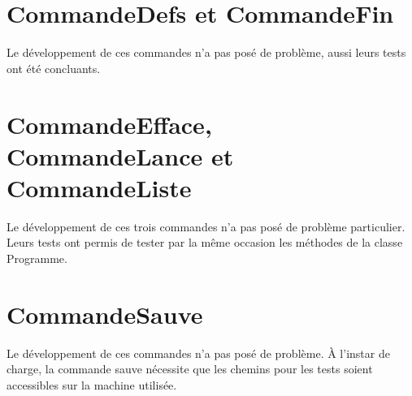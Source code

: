 \section{CommandeDefs et CommandeFin}

Le développement de ces commandes n'a pas posé de problème, aussi leurs
tests ont été concluants.

\section{CommandeEfface, CommandeLance et CommandeListe}

Le développement de ces trois commandes n'a pas posé de problème particulier.
Leurs tests ont permis de tester par la même occasion les méthodes de la classe
Programme.

\section{CommandeSauve}

Le développement de ces commandes n'a pas posé de problème.
À l'instar de charge, la commande sauve nécessite que les chemins pour les tests
soient accessibles sur la machine utilisée.